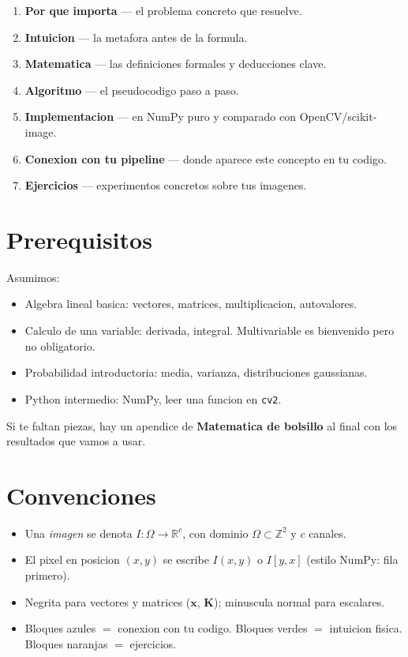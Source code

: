 \documentclass[11pt,a4paper,twoside,openright]{book}
\begin{document}
\begin{enumerate}[label=\arabic*., leftmargin=2em]
  \item \textbf{Por que importa} --- el problema concreto que resuelve.
  \item \textbf{Intuicion} --- la metafora antes de la formula.
  \item \textbf{Matematica} --- las definiciones formales y deducciones clave.
  \item \textbf{Algoritmo} --- el pseudocodigo paso a paso.
  \item \textbf{Implementacion} --- en NumPy puro y comparado con OpenCV/scikit-image.
  \item \textbf{Conexion con tu pipeline} --- donde aparece este concepto en tu codigo.
  \item \textbf{Ejercicios} --- experimentos concretos sobre tus imagenes.
\end{enumerate}

\section*{Prerequisitos}

Asumimos:
\begin{itemize}[leftmargin=2em]
  \item Algebra lineal basica: vectores, matrices, multiplicacion, autovalores.
  \item Calculo de una variable: derivada, integral. Multivariable es bienvenido pero no obligatorio.
  \item Probabilidad introductoria: media, varianza, distribuciones gaussianas.
  \item Python intermedio: NumPy, leer una funcion en \texttt{cv2}.
\end{itemize}

Si te faltan piezas, hay un apendice de \textbf{Matematica de bolsillo} al final con los resultados que vamos a usar.

\section*{Convenciones}

\begin{itemize}[leftmargin=2em]
  \item Una \emph{imagen} se denota $I: \Omega \to \mathbb{R}^c$, con dominio $\Omega \subset \mathbb{Z}^2$ y $c$ canales.
  \item El pixel en posicion $(x,y)$ se escribe $I(x,y)$ o $I[y,x]$ (estilo NumPy: fila primero).
  \item Negrita para vectores y matrices ($\mathbf{x}$, $\mathbf{K}$); minuscula normal para escalares.
  \item Bloques azules $=$ conexion con tu codigo. Bloques verdes $=$ intuicion fisica. Bloques naranjas $=$ ejercicios.
\end{itemize}
\end{document}
